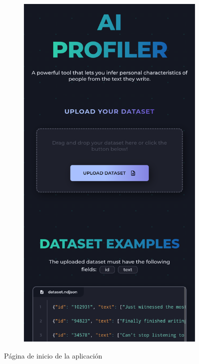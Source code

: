 \begin{figure}[H]
\begin{subfigure}[c]{0.21\textwidth}
		\includegraphics[width=\textwidth]{imagenes/home_movil.png}
		\label{fig:casouso_home_movil}
	\end{subfigure}
	\vspace{-1\baselineskip}
	\caption{Página de inicio de la aplicación}
	\label{fig:casouso_home}
\end{figure}

